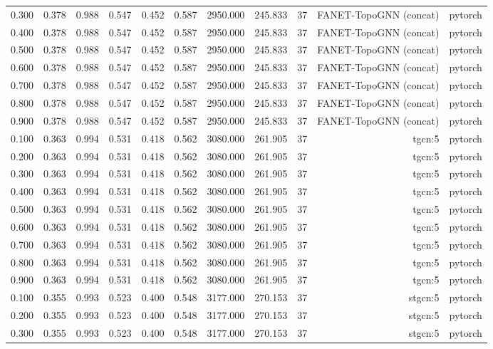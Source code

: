 \begin{tabular}{lrrrrrrrrrr}
0.300 & 0.378 & 0.988 & 0.547 & 0.452 & 0.587 & 2950.000 & 245.833 & 37 & FANET-TopoGNN (concat) & pytorch \\
0.400 & 0.378 & 0.988 & 0.547 & 0.452 & 0.587 & 2950.000 & 245.833 & 37 & FANET-TopoGNN (concat) & pytorch \\
0.500 & 0.378 & 0.988 & 0.547 & 0.452 & 0.587 & 2950.000 & 245.833 & 37 & FANET-TopoGNN (concat) & pytorch \\
0.600 & 0.378 & 0.988 & 0.547 & 0.452 & 0.587 & 2950.000 & 245.833 & 37 & FANET-TopoGNN (concat) & pytorch \\
0.700 & 0.378 & 0.988 & 0.547 & 0.452 & 0.587 & 2950.000 & 245.833 & 37 & FANET-TopoGNN (concat) & pytorch \\
0.800 & 0.378 & 0.988 & 0.547 & 0.452 & 0.587 & 2950.000 & 245.833 & 37 & FANET-TopoGNN (concat) & pytorch \\
0.900 & 0.378 & 0.988 & 0.547 & 0.452 & 0.587 & 2950.000 & 245.833 & 37 & FANET-TopoGNN (concat) & pytorch \\
0.100 & 0.363 & 0.994 & 0.531 & 0.418 & 0.562 & 3080.000 & 261.905 & 37 & tgcn:5 & pytorch \\
0.200 & 0.363 & 0.994 & 0.531 & 0.418 & 0.562 & 3080.000 & 261.905 & 37 & tgcn:5 & pytorch \\
0.300 & 0.363 & 0.994 & 0.531 & 0.418 & 0.562 & 3080.000 & 261.905 & 37 & tgcn:5 & pytorch \\
0.400 & 0.363 & 0.994 & 0.531 & 0.418 & 0.562 & 3080.000 & 261.905 & 37 & tgcn:5 & pytorch \\
0.500 & 0.363 & 0.994 & 0.531 & 0.418 & 0.562 & 3080.000 & 261.905 & 37 & tgcn:5 & pytorch \\
0.600 & 0.363 & 0.994 & 0.531 & 0.418 & 0.562 & 3080.000 & 261.905 & 37 & tgcn:5 & pytorch \\
0.700 & 0.363 & 0.994 & 0.531 & 0.418 & 0.562 & 3080.000 & 261.905 & 37 & tgcn:5 & pytorch \\
0.800 & 0.363 & 0.994 & 0.531 & 0.418 & 0.562 & 3080.000 & 261.905 & 37 & tgcn:5 & pytorch \\
0.900 & 0.363 & 0.994 & 0.531 & 0.418 & 0.562 & 3080.000 & 261.905 & 37 & tgcn:5 & pytorch \\
0.100 & 0.355 & 0.993 & 0.523 & 0.400 & 0.548 & 3177.000 & 270.153 & 37 & stgcn:5 & pytorch \\
0.200 & 0.355 & 0.993 & 0.523 & 0.400 & 0.548 & 3177.000 & 270.153 & 37 & stgcn:5 & pytorch \\
0.300 & 0.355 & 0.993 & 0.523 & 0.400 & 0.548 & 3177.000 & 270.153 & 37 & stgcn:5 & pytorch \\

\end{tabular}
